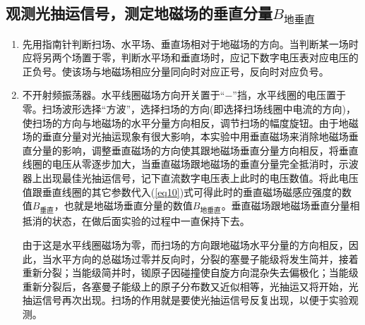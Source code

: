 \documentclass[a4paper]{article}
\begin{document}
\subsection{观测光抽运信号，测定地磁场的垂直分量$B_{\text{地垂直}}$}
\begin{enumerate}
\item 先用指南针判断扫场、水平场、垂直场相对于地磁场的方向。当判断某一场时应将另两个场置于零，判断水平场和垂直场时，应记下数字电压表对应电压的正负号。使该场与地磁场相应分量同向时对应正号，反向时对应负号。
\item 不开射频振荡器。水平线圈磁场方向开关置于“$-$”挡，水平线圈的电压置于零。扫场波形选择“方波”，选择扫场的方向(即选择扫场线圈中电流的方向)，使扫场的方向与地磁场的水平分量方向相反，调节扫场的幅度旋钮。由于地磁场的垂直分量对光抽运现象有很大影响，本实验中用垂直磁场来消除地磁场垂直分量的影响，调整垂直磁场的方向使其跟地磁场垂直分量方向相反，将垂直线圈的电压从零逐步加大，当垂直磁场跟地磁场的垂直分量完全抵消时，示波器上出现最佳光抽运信号，记下直流数字电压表上此时的电压数值。将此电压值跟垂直线圈的其它参数代入(\ref{eq10})式可得此时的垂直磁场磁感应强度的数值$B_{\text{垂直}}$，也就是地磁场垂直分量的数值$B_{\text{地垂直}}$。垂直磁场跟地磁场垂直分量相抵消的状态，在做后面实验的过程中一直保持下去。

由于这是水平线圈磁场为零，而扫场的方向跟地磁场水平分量的方向相反，因此，当水平方向的总磁场过零并反向时，分裂的塞曼子能级将发生简并，接着重新分裂；当能级简并时，铷原子因碰撞使自旋方向混杂失去偏极化；当能级重新分裂后，各塞曼子能级上的原子分布数又近似相等，光抽运又将开始，光抽运信号再次出现。扫场的作用就是要使光抽运信号反复出现，以便于实验观测。
\end{enumerate}
\end{document}
